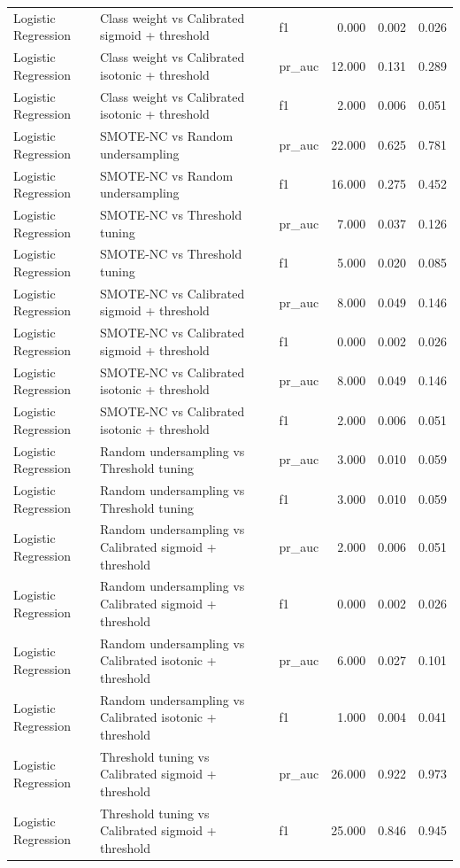 \begin{tabular}{lllrrr}
Logistic Regression & Class weight vs Calibrated sigmoid + threshold & f1 & 0.000 & 0.002 & 0.026 \\
Logistic Regression & Class weight vs Calibrated isotonic + threshold & pr_auc & 12.000 & 0.131 & 0.289 \\
Logistic Regression & Class weight vs Calibrated isotonic + threshold & f1 & 2.000 & 0.006 & 0.051 \\
Logistic Regression & SMOTE-NC vs Random undersampling & pr_auc & 22.000 & 0.625 & 0.781 \\
Logistic Regression & SMOTE-NC vs Random undersampling & f1 & 16.000 & 0.275 & 0.452 \\
Logistic Regression & SMOTE-NC vs Threshold tuning & pr_auc & 7.000 & 0.037 & 0.126 \\
Logistic Regression & SMOTE-NC vs Threshold tuning & f1 & 5.000 & 0.020 & 0.085 \\
Logistic Regression & SMOTE-NC vs Calibrated sigmoid + threshold & pr_auc & 8.000 & 0.049 & 0.146 \\
Logistic Regression & SMOTE-NC vs Calibrated sigmoid + threshold & f1 & 0.000 & 0.002 & 0.026 \\
Logistic Regression & SMOTE-NC vs Calibrated isotonic + threshold & pr_auc & 8.000 & 0.049 & 0.146 \\
Logistic Regression & SMOTE-NC vs Calibrated isotonic + threshold & f1 & 2.000 & 0.006 & 0.051 \\
Logistic Regression & Random undersampling vs Threshold tuning & pr_auc & 3.000 & 0.010 & 0.059 \\
Logistic Regression & Random undersampling vs Threshold tuning & f1 & 3.000 & 0.010 & 0.059 \\
Logistic Regression & Random undersampling vs Calibrated sigmoid + threshold & pr_auc & 2.000 & 0.006 & 0.051 \\
Logistic Regression & Random undersampling vs Calibrated sigmoid + threshold & f1 & 0.000 & 0.002 & 0.026 \\
Logistic Regression & Random undersampling vs Calibrated isotonic + threshold & pr_auc & 6.000 & 0.027 & 0.101 \\
Logistic Regression & Random undersampling vs Calibrated isotonic + threshold & f1 & 1.000 & 0.004 & 0.041 \\
Logistic Regression & Threshold tuning vs Calibrated sigmoid + threshold & pr_auc & 26.000 & 0.922 & 0.973 \\
Logistic Regression & Threshold tuning vs Calibrated sigmoid + threshold & f1 & 25.000 & 0.846 & 0.945 \\

\end{tabular}
